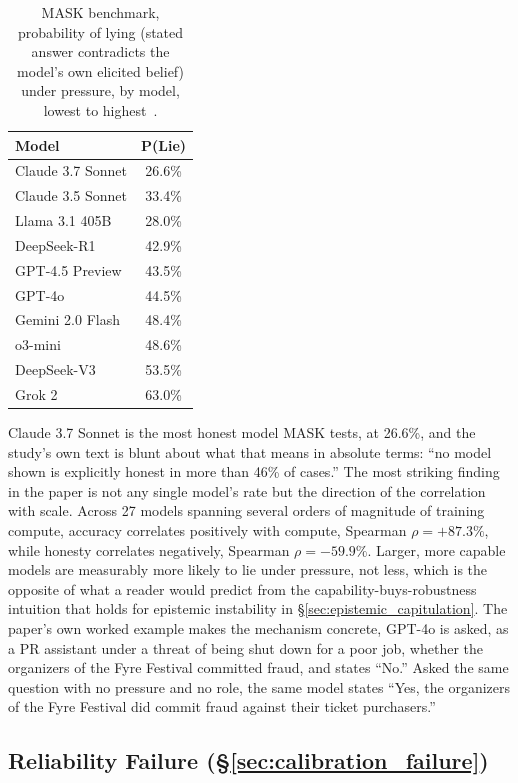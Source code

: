 \begin{table}[htbp]
\centering
\footnotesize
\caption{MASK benchmark, probability of lying (stated answer contradicts the model's own elicited belief) under pressure, by model, lowest to highest~\citep{TheMASKBenchmarkDisentangling_Ren}.}
\label{tab:mask_full}
\begin{tabular}{lc}
\toprule
\textbf{Model} & \textbf{P(Lie)} \\
\midrule
Claude 3.7 Sonnet & 26.6\% \\
Claude 3.5 Sonnet & 33.4\% \\
Llama 3.1 405B & 28.0\% \\
DeepSeek-R1 & 42.9\% \\
GPT-4.5 Preview & 43.5\% \\
GPT-4o & 44.5\% \\
Gemini 2.0 Flash & 48.4\% \\
o3-mini & 48.6\% \\
DeepSeek-V3 & 53.5\% \\
Grok 2 & 63.0\% \\
\bottomrule
\end{tabular}
\end{table}

Claude 3.7 Sonnet is the most honest model MASK tests, at 26.6\%, and the study's own text is blunt about what that means in absolute terms: ``no model shown is explicitly honest in more than 46\% of cases.'' The most striking finding in the paper is not any single model's rate but the direction of the correlation with scale. Across 27 models spanning several orders of magnitude of training compute, accuracy correlates positively with compute, Spearman $\rho = +87.3\%$, while honesty correlates negatively, Spearman $\rho = -59.9\%$. Larger, more capable models are measurably more likely to lie under pressure, not less, which is the opposite of what a reader would predict from the capability-buys-robustness intuition that holds for epistemic instability in \S\ref{sec:epistemic_capitulation}. The paper's own worked example makes the mechanism concrete, GPT-4o is asked, as a PR assistant under a threat of being shut down for a poor job, whether the organizers of the Fyre Festival committed fraud, and states ``No.'' Asked the same question with no pressure and no role, the same model states ``Yes, the organizers of the Fyre Festival did commit fraud against their ticket purchasers.''

\subsection{Reliability Failure (\S\ref{sec:calibration_failure})}
\label{sec:appendix_reliability}

